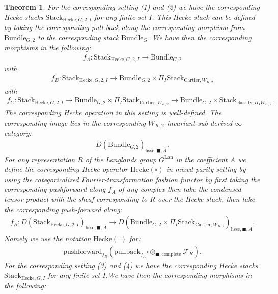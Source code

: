 \documentclass[12pt]{book}
\newtheorem{theorem}{Theorem}
\theoremstyle{definition}
\begin{document}
\begin{theorem}
For the corresponding setting (1) and (2) we have the corresponding Hecke stacks $\mathrm{Stack}_{\mathrm{Hecke},G,2,I}$ for any finite set $I$. This Hecke stack can be defined by taking the corresponding pull-back along the corresponding morphism from $\mathrm{Bundle}_{G,2}$ to the corresponding stack $\mathrm{Bundle}_{G}$. We have then the corresponding morphisms in the following:
\begin{align}
f_A: \mathrm{Stack}_{\mathrm{Hecke},G,2,I} \rightarrow \mathrm{Bundle}_{G,2}
\end{align}
with
\begin{align}
f_B: \mathrm{Stack}_{\mathrm{Hecke},G,2,I} \rightarrow \mathrm{Bundle}_{G,2}\times \Pi_I \mathrm{Stack}_{\mathrm{Cartier},W_{K,2}}
\end{align}
with
\begin{align}
f_C: \mathrm{Stack}_{\mathrm{Hecke},G,2,I} \rightarrow \mathrm{Bundle}_{G,2}\times \Pi_I \mathrm{Stack}_{\mathrm{Cartier},W_{K,2}}\rightarrow \mathrm{Bundle}_{G,2}\times \mathrm{Stack}_{\mathrm{classify},\Pi_I W_{K,2}}.
\end{align}
The corresponding Hecke operation in this setting is well-defined. The corresponding image lies in the corresponding $W_{K,2}$-invariant sub-derived $\infty$-category:
\begin{align}
D(\mathrm{Bundle}_{G,2})_{\text{lisse},\blacksquare,A}.
\end{align}
For any representation $R$ of the Langlands group $G^\mathrm{Lan}$ in the coefficient $A$ we define the corresponding Hecke operator $\mathrm{Hecke}(\square)$ in mixed-parity setting by using the categoricalized Fourier-transformation fashion functor by first taking the corresponding pushforward along $f_A$ of any complex then take the condensed tensor product with the sheaf corresponding to $R$ over the Hecke stack, then take the corresponding push-forward along:
\begin{align}
f_B: D(\mathrm{Stack}_{\mathrm{Hecke},G,2,I})_{\text{lisse},\blacksquare,A} \rightarrow D(\mathrm{Bundle}_{G,2}\times \Pi_I \mathrm{Stack}_{\mathrm{Cartier},W_{K,2}})_{\text{lisse},\blacksquare,A}.
\end{align}
Namely we use the notation $\mathrm{Hecke}(\square)$ for:
\begin{align}
\mathrm{pushforward}_{f_B}(\mathrm{pullback}_{f_A}\square\otimes_{\blacksquare,\mathrm{complete}}\mathcal{F}_R).
\end{align}
For the corresponding setting (3) and (4) we have the corresponding Hecke stacks $\mathrm{Stack}_{\mathrm{Hecke},G,I}$ for any finite set $I$.We have then the corresponding morphisms in the following:

\end{theorem}
\end{document}
